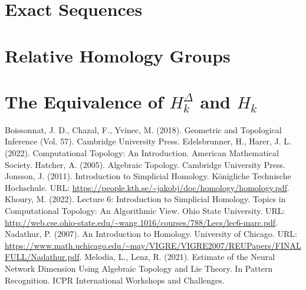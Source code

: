 \documentclass{article}
\begin{document}
\section{Exact Sequences}
\section{Relative Homology Groups}
\section{The Equivalence of $H_k^\Delta$ and $H_k$}

\begin{thebibliography}{100}
 Boissonnat, J. D., Chazal, F., Yvinec, M. (2018). Geometric and Topological Inference (Vol. 57). Cambridge University Press.
 Edelsbrunner, H., Harer, J. L. (2022). Computational Topology: An Introduction. American Mathematical Society.
 Hatcher, A. (2005). Algebraic Topology. Cambridge University Press.
 Jonsson, J. (2011). Introduction to Simplicial Homology. Königliche Technische Hochschule. URL: \url{https://people.kth.se/~jakobj/doc/homology/homology.pdf}.
 Khoury, M. (2022). Lecture 6: Introduction to Simplicial Homology. Topics in Computational Topology: An Algorithmic View. Ohio State University. URL: \url{http://web.cse.ohio-state.edu/~wang.1016/courses/788/Lecs/lec6-marc.pdf}.
 Nadathur, P. (2007). An Introduction to Homology. University of Chicago. URL: \url{https://www.math.uchicago.edu/~may/VIGRE/VIGRE2007/REUPapers/FINALFULL/Nadathur.pdf}.
 Melodia, L., Lenz, R. (2021). Estimate of the Neural Network Dimension Using Algebraic Topology and Lie Theory. In Pattern Recognition. ICPR International Workshops and Challenges.
\end{thebibliography}
\end{document}
